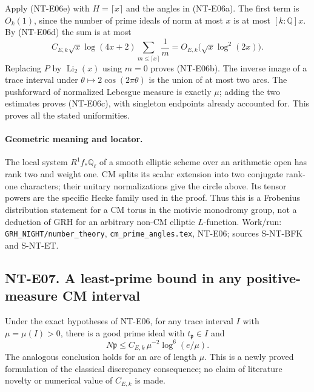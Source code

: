 Apply (NT-E06e) with $H=\lceil x\rceil$ and the angles in (NT-E06a).
The first term is $O_k(1)$, since the number of prime ideals of norm at
most $x$ is at most $[k:\mathbb Q]x$. By (NT-E06d) the sum is at most
\[
 C_{E,k}\sqrt x\log(4x+2)\sum_{m\le\lceil x\rceil}\frac1m
     =O_{E,k}\bigl(\sqrt x\log^2(2x)\bigr).
\]
Replacing $P$ by $\operatorname{Li}_2(x)$ using $m=0$ proves
(NT-E06b). The inverse image of a trace interval under
$\theta\mapsto2\cos(2\pi\theta)$ is the union of at most two arcs.
The pushforward of normalized Lebesgue measure is exactly $\mu$;
adding the two estimates proves (NT-E06c), with singleton endpoints
already accounted for. This proves all the stated uniformities.

\paragraph{Geometric meaning and locator.}
The local system $R^1f_*\mathbb Q_\ell$ of a smooth elliptic scheme over
an arithmetic open has rank two and weight one. CM splits its scalar
extension into two conjugate rank-one characters; their unitary
normalizations give the circle above. Its tensor powers are the
specific Hecke family used in the proof. Thus this is a Frobenius
distribution statement for a CM torus in the motivic monodromy group,
not a deduction of GRH for an arbitrary non-CM elliptic $L$-function.
Work/run: \texttt{GRH\_NIGHT/number\_theory},
\texttt{cm\_prime\_angles.tex}, NT-E06; sources S-NT-BFK and S-NT-ET.

\subsection*{NT-E07. A least-prime bound in any positive-measure CM interval}
Under the exact hypotheses of NT-E06, for any trace interval $I$ with
$\mu=\mu(I)>0$, there is a good prime ideal with $t_{\mathfrak p}\in I$
and
\[
 N\mathfrak p\le C_{E,k}\,\mu^{-2}\log^6(e/\mu).           \tag{NT-E07}
\]
The analogous conclusion holds for an arc of length $\mu$. This is a
newly proved formulation of the classical discrepancy consequence;
no claim of literature novelty or numerical value of $C_{E,k}$ is made.

